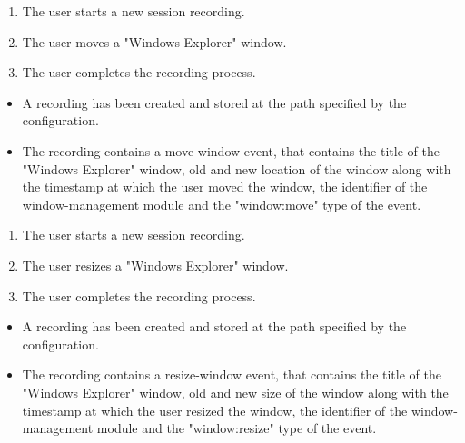 \begin{tests}
	{\begin{enumerate}
		\item The \gls{user} starts a new \gls{session} recording.
		\item The \gls{user} moves a "Windows Explorer" window.
		\item The \gls{user} completes the recording process.
	\end{enumerate}}
	{\begin{itemize}
		\item A recording has been created and stored at the path specified by the configuration.
		\item The recording contains a move-window \gls{event},  that contains the title of the "Windows Explorer" window, old and new location of the window along with the timestamp at which the \gls{user} moved the window, the identifier of the window-management module and the "window:move" type of the event.
	\end{itemize}}
\newpage	
	{\begin{enumerate}
		\item The \gls{user} starts a new \gls{session} recording.
		\item The \gls{user} resizes a "Windows Explorer" window.
		\item The \gls{user} completes the recording process.
	\end{enumerate}}
	{\begin{itemize}
		\item A recording has been created and stored at the path specified by the configuration.
		\item The recording contains a resize-window \gls{event},  that contains the title of the "Windows Explorer" window, old and new size of the window along with the timestamp at which the \gls{user} resized the window, the identifier of the window-management module and the "window:resize" type of the event.
	\end{itemize}}
	

\end{tests}
